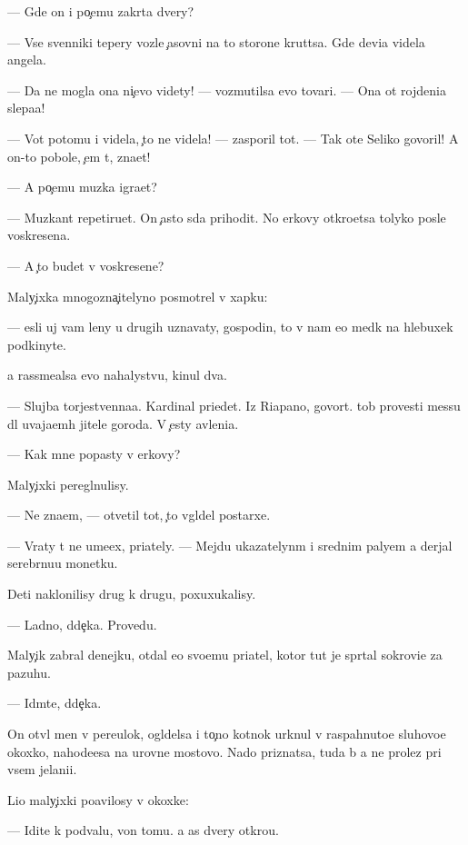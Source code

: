 \documentclass[10pt]{book}
\begin{document}
— Gde on i po{\c}emu zakr{\yi}ta dvery?

— Vse sv{\ia}{\x}enniki tepery vozle {\c}asovni na to{\y} storone krut{\ia}tsa. Gde devi{\q}a videla angela.

— Da ne mogla ona ni{\c}evo videty! — vozmutilsa {\y}evo tovari{\x}. — Ona ot rojdeni{\y}a slepa{\y}a!

— Vot potomu i videla, {\c}to ne videla! — zasporil tot. — Tak ote{\q} Seliko govoril! A on-to pobole, {\c}em t{\yi}, zna{\y}et!

— A po{\c}emu muz{\yi}ka igra{\y}et?

— Muz{\yi}kant repetiru{\y}et. On {\c}asto s{\iu}da prihodit. No {\q}erkovy otkro{\y}etsa tolyko posle voskresen{\y}a.

— A {\c}to budet v voskresen{\y}e?

Maly{\c}ixka mnogozna{\c}itelyno posmotrel v xapku:

— {\Y}esli uj vam leny u drugih uznavaty, gospodin, to v{\yi} nam {\y}e{\x}o med{\ia}k na hlebuxek podkinyte.

{\Y}a rassme{\y}alsa {\y}evo nahalystvu, kinul dva.

— Slujba torjestvenna{\y}a. Kardinal pri{\y}edet. Iz Riapano, govor{\ia}t. {\C}tob{\yi} provesti messu dl{\ia} uvaja{\y}em{\yi}h jitele{\y} goroda. V {\c}esty {\y}avleni{\y}a.

— Kak mne popasty v {\q}erkovy?

Maly{\c}ixki peregl{\ia}nulisy.

— Ne zna{\y}em, — otvetil tot, {\c}to v{\yi}gl{\ia}del postarxe.

— Vraty t{\yi} ne ume{\y}ex, pri{\y}ately. — Mejdu ukazatelyn{\yi}m i srednim paly{\q}em {\y}a derjal serebr{\ia}nu{\y}u monetku.

Deti naklonilisy drug k drugu, poxuxukalisy.

— Ladno, d{\ia}de{\c}ka. Provedu.

Maly{\c}ik zabral denejku, otdal {\y}e{\y}o svo{\y}emu pri{\y}atel{\iu}, kotor{\yi}{\y} tut je spr{\ia}tal sokrovi{\x}e za pazuhu.

— Id{\e}mte, d{\ia}de{\c}ka.

On otv{\e}l men{\ia} v pereulok, ogl{\ia}delsa i to{\c}no kot{\e}nok {\y}urknul v raspahnuto{\y}e sluhovo{\y}e okoxko, nahod{\ia}{\x}e{\y}esa na urovne mostovo{\y}. Nado priznatsa, tuda b{\yi} {\y}a ne prolez pri vsem jelani{\y}i.

Li{\q}o maly{\c}ixki po{\y}avilosy v okoxke:

— Idite k podvalu, von tomu. {\Y}a {\x}as dvery otkro{\y}u.
\end{document}
